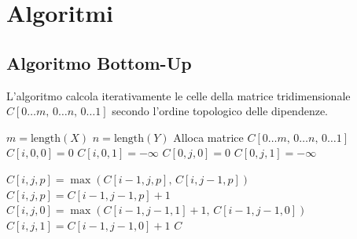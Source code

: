 \section{Algoritmi}

\newpage
\subsection{Algoritmo Bottom-Up}
L'algoritmo calcola iterativamente le celle della matrice tridimensionale $C[0 \dots m, \, 0 \dots n, \, 0 \dots 1]$ secondo l'ordine topologico delle dipendenze.\begin{algorithm}[H]
\caption{Costruzione Bottom-Up per LCS con numero pari di elementi rossi}
\begin{algorithmic}[1]
\State $m = \text{length}(X)$
\State $n = \text{length}(Y)$
\State Alloca matrice $C[0 \dots m, \, 0 \dots n, \, 0 \dots 1]$\Statex {}
    \State $C[i, 0, 0] = 0$
    \State $C[i, 0, 1] = -\infty$
\EndFor
{}
    \State $C[0, j, 0] = 0$
    \State $C[0, j, 1] = -\infty$
\EndFor

\Statex {}
                \State $C[i, j, p] = \max(C[i-1, j, p], \, C[i, j-1, p])$
                \State $C[i, j, p] = C[i-1, j-1, p] + 1$
            \Else {}
                    \State $C[i, j, 0] = \max(C[i-1, j-1, 1] + 1, \, C[i-1, j-1, 0])$
                \Else {}
                    \State $C[i, j, 1] = C[i-1, j-1, 0] + 1$
                \EndIf
            \EndIf
        \EndFor
    \EndFor
\EndFor
\State \Return $C$ 
\EndProcedure
\end{algorithmic}
\end{algorithm}

\newpage
